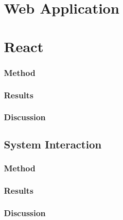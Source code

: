 \section{Web Application}
    \section{React}
        \subsubsection{Method}
        \subsubsection{Results}
        \subsubsection{Discussion}
    \subsection{System Interaction}
        \subsubsection{Method}
        \subsubsection{Results}
        \subsubsection{Discussion}